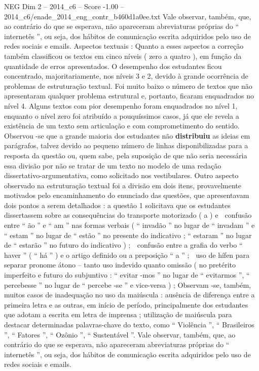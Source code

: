 \begin{textsample}{NEG Dim 2 – 2014\_c6 – Score -1.00 – 2014\_c6/enade\_2014\_eng\_contr\_b460d1a0ee.txt}
Vale observar, também, que, ao contrário do que se esperava, não apareceram abreviaturas próprias do “ internetês ”, ou seja, dos hábitos de comunicação escrita adquiridos pelo uso de redes sociais e emails.
Aspectos textuais : Quanto a esses aspectos a correção também classificou os textos em cinco níveis ( zero a quatro ), em função da quantidade de erros apresentados.
O desempenho dos estudantes ficou concentrado, majoritariamente, nos níveis 3 e 2, devido à grande ocorrência de problemas de estruturação textual.
Foi muito baixo o número de textos que não apresentaram qualquer problema estrutural e, portanto, ficaram enquadrados no nível 4.
Alguns textos com pior desempenho foram enquadrados no nível 1, enquanto o nível zero foi atribuído a pouquíssimos casos, já que ele revela a existência de um texto sem articulação e com comprometimento do sentido.
Observou -se que a grande maioria dos estudantes não \textbf{distribuiu} as ideias em parágrafos, talvez devido ao pequeno número de linhas disponibilizadas para a resposta da questão ou, quem sabe, pela suposição de que não seria necessária essa divisão por não se tratar de um texto no modelo de uma redação dissertativo-argumentativa, como solicitado nos vestibulares.
Outro aspecto observado na estruturação textual foi a divisão em dois itens, provavelmente motivados pelo encaminhamento do enunciado das questões, que apresentavam dois pontos a serem detalhados : a questão 1 solicitava que os estudantes dissertassem sobre as consequências do transporte motorizado ( a ) e  confusão entre “ ão ” e “ am ” nas formas verbais ( “ invadão ” no lugar de “ invadam ” e “ estam ” no lugar de “ estão ” no presente do indicativo ; “ estaram ” no lugar de “ estarão ” no futuro do indicativo ) ;  confusão entre a grafia do verbo “ haver ” ( “ há ” ) e o artigo definido ou a preposição “ a ” ;  uso de hífen para separar pronome átono – tanto uso indevido quanto omissão ( no pretérito imperfeito e futuro do subjuntivo : “ evitar -mos ” no lugar de “ evitarmos ”, “ percebesse ” no lugar de “ percebe -se ” e vice-versa ) ; Observam -se, também, muitos casos de inadequação no uso da maiúscula : ausência de diferença entre a primeira letra e as outras, em início de período, principalmente dos estudantes que adotam a escrita em letra de imprensa ; utilização de maiúscula para destacar determinadas palavras-chave do texto, como “ Violência ”, “ Brasileiros ”, “ Fatores ”, “ Ozônio ”, “ Sustentável ”.
Vale observar, também, que, ao contrário do que se esperava, não apareceram abreviaturas próprias do “ internetês ”, ou seja, dos hábitos de comunicação escrita adquiridos pelo uso de redes sociais e emails.

\end{textsample}
